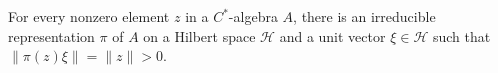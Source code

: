 For every nonzero element $z$ in a $C^*$-algebra $A$, there is an irreducible representation $\pi$ of $A$ on a Hilbert space $\mathcal{H}$ and a unit vector $\xi \in \mathcal{H}$ such that $\|\pi(z)\xi\| = \|z\| > 0$.
